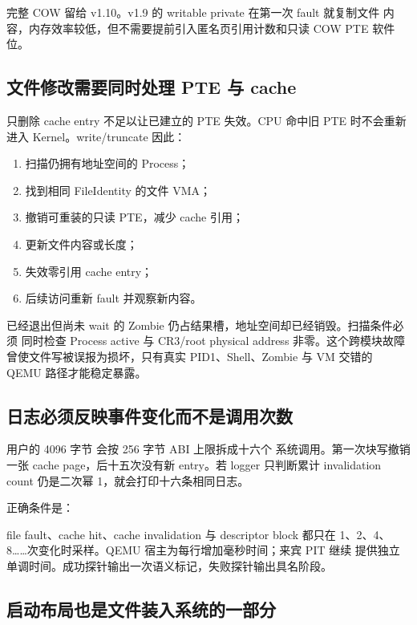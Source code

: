 完整 COW 留给 v1.10。v1.9 的 writable private 在第一次 fault 就复制文件
内容，内存效率较低，但不需要提前引入匿名页引用计数和只读 COW PTE 软件位。

\subsection{文件修改需要同时处理 PTE 与 cache}

只删除 cache entry 不足以让已建立的 PTE 失效。CPU 命中旧 PTE 时不会重新
进入 Kernel。write/truncate 因此：

\begin{enumerate}[label=\arabic*.]
  \item 扫描仍拥有地址空间的 Process；
  \item 找到相同 FileIdentity 的文件 VMA；
  \item 撤销可重装的只读 PTE，减少 cache 引用；
  \item 更新文件内容或长度；
  \item 失效零引用 cache entry；
  \item 后续访问重新 fault 并观察新内容。
\end{enumerate}

已经退出但尚未 wait 的 Zombie 仍占结果槽，地址空间却已经销毁。扫描条件必须
同时检查 Process active 与 CR3/root physical address 非零。这个跨模块故障
曾使文件写被误报为损坏，只有真实 PID1、Shell、Zombie 与 VM 交错的 QEMU
路径才能稳定暴露。

\subsection{日志必须反映事件变化而不是调用次数}

用户的 4096 字节  会按 256 字节 ABI 上限拆成十六个
系统调用。第一次块写撤销一张 cache page，后十五次没有新 entry。若 logger
只判断累计 invalidation count 仍是二次幂 1，就会打印十六条相同日志。

正确条件是：

\begin{center}
\end{center}

file fault、cache hit、cache invalidation 与 descriptor block 都只在
1、2、4、8……次变化时采样。QEMU 宿主为每行增加毫秒时间；来宾 PIT 继续
提供独立单调时间。成功探针输出一次语义标记，失败探针输出具名阶段。

\subsection{启动布局也是文件装入系统的一部分}

